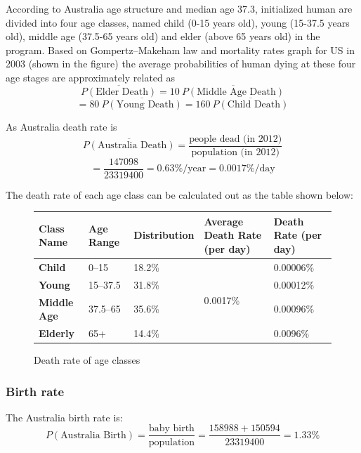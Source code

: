 \documentclass[a4paper]{article}
\newcommand*\mean[1]{\overline{#1}}
\begin{document}
According to Australia age structure\cite{agestructure} and median age 37.3\cite{demographicsaustralia}, initialized human are divided into four age classes, named child (0-15 years old), young (15-37.5 years old), middle age (37.5-65 years old) and elder (above 65 years old) in the program.
Based on Gompertz–Makeham law\cite{mortalitylaw} and mortality rates graph for US in 2003 (shown in the figure) the average probabilities of human dying at these four age stages are approximately related as 
$$ \mean{P(\text{Elder Death})} = 10\: \mean{P(\text{Middle Age Death})} $$
$$ = 80\: \mean{P(\text{Young Death})} = 160\: \mean{P(\text{Child Death})} $$

As Australia death rate\cite{absdeath} is
$$ \mean{P(\text{Australia Death})} = \frac{\text{people dead (in 2012)}}{\text{population (in 2012)}} $$
$$ = \frac{147098}{23319400} = 0.63\%/\text{year} = 0.0017\%/\text{day} $$

The death rate of each age class can be calculated out as the table shown below:

\begin{figure}[ht]
    \centering
    \begin{tabu} {| X[1.1,c,p] || X[0.7,c,p] | X[1.2,c,p] | X[1.1,c,p] | X[1,c,p] |}
        \rowfont{\bfseries}
        \hline
        Class Name &
        Age Range &
        Distribution &
        Average Death Rate (per day) &
        Death Rate (per day) \\
        \hline
        \hline
        \textbf{Child} & 0--15 & 18.2\% &  & 0.00006\% \\
        \textbf{Young} & 15--37.5 & 31.8\% & & 0.00012\% \\
        \textbf{Middle Age} & 37.5--65 & 35.6\% & & 0.00096\% \\
        \textbf{Elderly} & 65+ & 14.4\% & & 0.0096\% \\
        \hline
    \end{tabu}
    \caption{Death rate of age classes}
\end{figure}

\subsubsection{Birth rate}

The Australia birth rate is\cite{absbirth}:
$$ P(\text{Australia Birth}) = \frac{\text{baby birth}}{\text{population}} = \frac{158988+150594}{23319400} = 1.33\% $$
\end{document}
